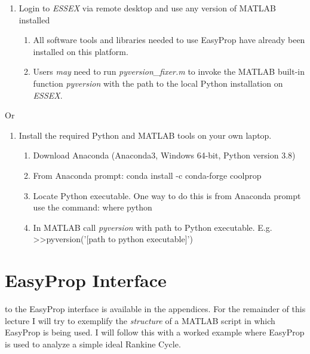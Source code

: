 \begin{enumerate}
\item Login to \emph{ESSEX} via remote desktop and use any version of MATLAB installed
\begin{enumerate}
\item All software tools and libraries needed to use EasyProp have already been installed on this platform.
\item Users \emph{may} need to run \emph{pyversion\_fixer.m} to invoke the MATLAB built-in function \emph{pyversion} with the path to the local Python installation on \emph{ESSEX}.
\end{enumerate}
\end{enumerate}
Or
\begin{enumerate}[resume]
\item Install the required Python and MATLAB tools on your own laptop.
\begin{enumerate}
\item Download Anaconda (Anaconda3, Windows 64-bit, Python version 3.8) 
\item From Anaconda prompt: conda install -c conda-forge coolprop
\item Locate Python executable.  One way to do this is from Anaconda prompt use the command: where python
\item In MATLAB call \emph{pyversion} with path to Python executable. E.g. >>pyversion('[path to python executable]')
\end{enumerate}
\end{enumerate}

\section{EasyProp Interface}
 to the EasyProp interface is available in the appendices.  For the remainder of this lecture I will try to exemplify the \emph{structure} of a MATLAB script in which EasyProp is being used.  I will follow this with a worked example where EasyProp is used to analyze a simple ideal Rankine Cycle.

